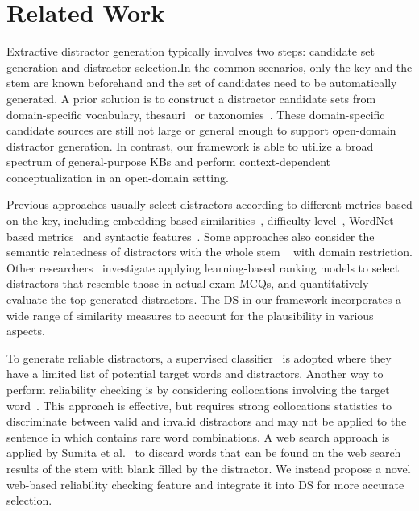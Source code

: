 \section{Related Work}
Extractive distractor generation typically involves two steps: 
candidate set generation and distractor selection.In the common scenarios, only the key and the stem are known beforehand and the set of candidates need 
to be automatically generated. A prior solution is to construct a distractor 
candidate sets from domain-specific vocabulary, 
thesauri~\cite{sumita2005measuring,smith2010gap} 
or taxonomies~\cite{mitkov2009semantic}. 
These domain-specific candidate sources are still not large or general enough to support open-domain distractor generation. In contrast, our framework is able to utilize a broad spectrum of general-purpose KBs and perform context-dependent conceptualization in an open-domain setting.

Previous approaches usually select distractors according to different metrics based on the key, including embedding-based similarities~\cite{guo2016questimator}, difficulty level~\cite{brown2005automatic,coniam2013preliminary}, WordNet-based metrics~\cite{mitkov2003computer} and 
syntactic features~\cite{agarwal2011automatic}.
Some approaches also consider the semantic relatedness of distractors with the whole stem ~\cite{pino2008selection,mostow2012generating} with domain restriction. Other researchers~\cite{liang2017distractor,liang2018distractor} investigate applying learning-based ranking models to select distractors that resemble those in actual exam MCQs, and quantitatively evaluate the top generated distractors. The DS in our framework incorporates a wide range of similarity measures to account for the plausibility in various aspects.

To generate reliable distractors, a supervised classifier~\cite{lee2007automatic} is adopted where they have a limited list of potential target words and distractors. 
Another way to perform reliability checking is by considering collocations 
involving the target word~\cite{smith2010gap,jiang2017distractor}. 
This approach is effective, but requires strong collocations statistics to 
discriminate between valid and invalid distractors and may not be applied to
the sentence in  which contains rare word combinations. 
A web search approach is applied by Sumita et al.~ to discard words that can be found on the web search results of the stem with blank filled by the distractor. We instead propose a novel web-based reliability checking feature and integrate it into DS for more accurate selection.
